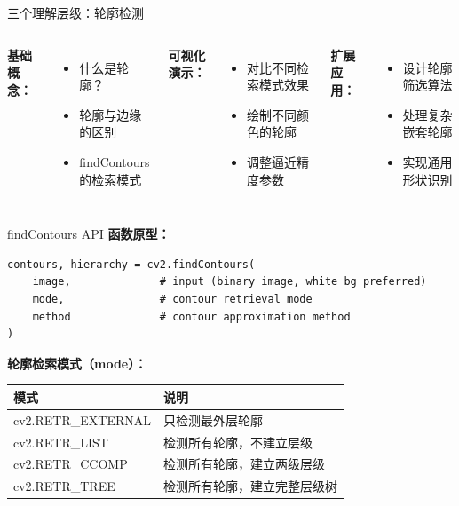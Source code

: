 \begin{frame}{三个理解层级：轮廓检测}
    \begin{columns}
        \textbf{基础概念：}
        \begin{itemize}
            \item 什么是轮廓？
            \item 轮廓与边缘的区别
            \item findContours的检索模式
        \end{itemize}

        \textbf{可视化演示：}
        \begin{itemize}
            \item 对比不同检索模式效果
            \item 绘制不同颜色的轮廓
            \item 调整逼近精度参数
        \end{itemize}

        \textbf{扩展应用：}
        \begin{itemize}
            \item 设计轮廓筛选算法
            \item 处理复杂嵌套轮廓
            \item 实现通用形状识别
        \end{itemize}
    \end{columns}
\end{frame}

\begin{frame}[fragile]{findContours API}
    \textbf{函数原型：}
    \begin{lstlisting}[basicstyle=\ttfamily\scriptsize]
contours, hierarchy = cv2.findContours(
    image,              # input (binary image, white bg preferred)
    mode,               # contour retrieval mode
    method              # contour approximation method
)
    \end{lstlisting}

    \textbf{轮廓检索模式（mode）：}

    \begin{table}
        \centering
        \small
        \begin{tabular}{ll}
            \toprule
            \textbf{模式} & \textbf{说明} \\
            \midrule
            cv2.RETR\_EXTERNAL & 只检测最外层轮廓 \\
            cv2.RETR\_LIST & 检测所有轮廓，不建立层级 \\
            cv2.RETR\_CCOMP & 检测所有轮廓，建立两级层级 \\
            cv2.RETR\_TREE & 检测所有轮廓，建立完整层级树 \\
            \bottomrule
        \end{tabular}
    \end{table}
\end{frame}

